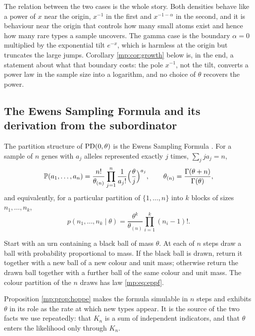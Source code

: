 The relation between the two cases is the whole story. Both densities behave like a power of
$x$ near the origin, $x^{-1}$ in the first and $x^{-1-\alpha}$ in the second, and it is
behaviour near the origin that controls how many small atoms exist and hence how many rare
types a sample uncovers. The gamma case is the boundary $\alpha=0$ multiplied by the
exponential tilt $e^{-x}$, which is harmless at the origin but truncates the large jumps.
Corollary \ref{mp:cor:growth} below is, in the end, a statement about what that boundary costs: the pole $x^{-1}$, not the tilt,
converts a power law in the sample size into a logarithm, and no choice of $\theta$ recovers
the power.

\subsection{The Ewens Sampling Formula and its derivation from the subordinator}

The partition structure of $\mathrm{PD}(0,\theta)$ is the Ewens Sampling Formula
\citep{mp:ewens1972,mp:ewens2004}. For a sample of
$n$ genes with $a_j$ alleles represented exactly $j$ times, $\sum_jja_j=n$,
\begin{equation}
\mathbb{P}(a_1,\dots,a_n)=\frac{n!}{\theta_{(n)}}\prod_{j=1}^n\frac{1}{a_j!}
\Big(\frac{\theta}{j}\Big)^{a_j},\qquad
\theta_{(n)}=\frac{\Gamma(\theta+n)}{\Gamma(\theta)} ,
\label{mp:eq:esf}
\end{equation}
and equivalently, for a particular partition of $\{1,\dots,n\}$ into $k$ blocks of sizes $n_1,\dots,n_k$,
\begin{equation}
p(n_1,\dots,n_k\mid\theta)=\frac{\theta^k}{\theta_{(n)}}\prod_{i=1}^k(n_i-1)! .
\label{mp:eq:eppf}
\end{equation}

\begin{proposition}
\label{mp:prop:hoppe}
Start with an urn containing a black ball of mass $\theta$. At each of $n$ steps draw a ball
with probability proportional to mass. If the black ball is drawn, return it together with a
new ball of a new colour and unit mass; otherwise return the drawn ball together with a
further ball of the same colour and unit mass. The colour partition of the $n$ draws has law
\eqref{mp:eq:eppf}.
\end{proposition}

Proposition \ref{mp:prop:hoppe} makes the formula simulable in $n$ steps and exhibits $\theta$
in its role as the rate at which new types appear. It is the source of the two facts we use
repeatedly: that $K_n$ is a sum of independent indicators, and that $\theta$ enters the
likelihood only through $K_n$.

